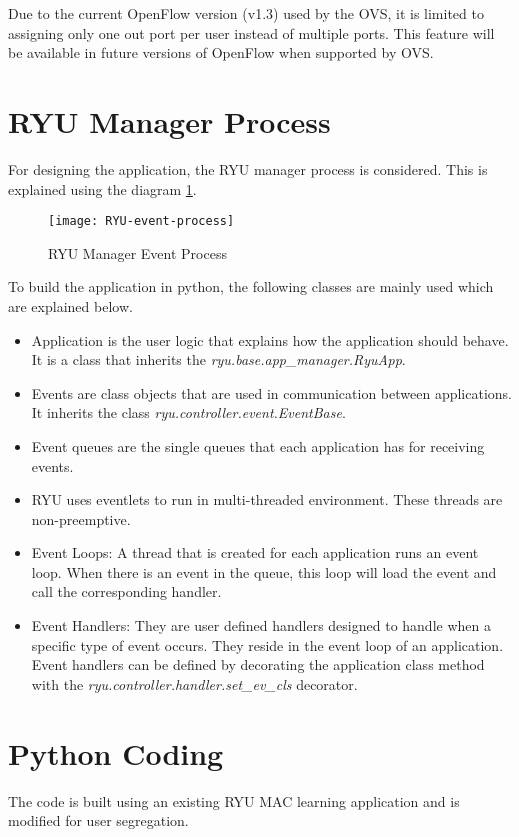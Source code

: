Due to the current OpenFlow version (v1.3) used by the OVS, it is limited to assigning only one out port per user instead of multiple ports. This feature will be available in future versions of OpenFlow when supported by OVS.

\section{RYU Manager Process \cite{RYU_app_process}} \label{RYU_Manager_Process}
 For designing the application, the RYU manager process is considered. This is explained using the diagram \ref{fig:RYU-Event-Process}.
 \begin{figure}
 	\centering
 	\texttt{[image: RYU-event-process]}
 	\caption {RYU Manager Event Process \cite{RYU_event_process_diag}}
 	\label{fig:RYU-Event-Process}
 	\vspace{-10pt}
 \end{figure}
To build the application in python, the following classes are mainly used which are explained below.

\begin{itemize}
	\item Application is the user logic that explains how the application should behave. It is a class that inherits the \textit{ryu.base.app\_manager.RyuApp}.
	\item Events are class objects that are used in communication between applications. It inherits the class \textit{ryu.controller.event.EventBase}.
	\item Event queues are the single queues that each application has for receiving events.
	\item RYU uses eventlets to run in multi-threaded environment. These threads are non-preemptive.
	\item Event Loops: A thread that is created for each application runs an event loop. When there is an event in the queue, this loop will load the event and call the corresponding handler.
	\item Event Handlers:  They are user defined handlers designed to handle when a specific type of event occurs. They reside in the event loop of an application. Event handlers can be defined by decorating the application class method with the \textit{ryu.controller.handler.set\_ev\_cls} decorator.
	
\end{itemize}

\section{Python Coding}\label{Python_code}
The code is built using an existing RYU MAC learning application and is modified for user segregation.

